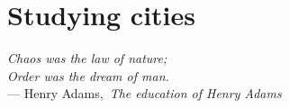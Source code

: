 \chapter{Studying cities}
\label{sec:studying_cities}

\begin{flushright}{\slshape    
Chaos was the law of nature;\\
Order was the dream of man.} \\ \medskip
--- Henry Adams,\, \emph{The education of Henry Adams}~\cite{Adams:1990}
\end{flushright}

\bigskip


